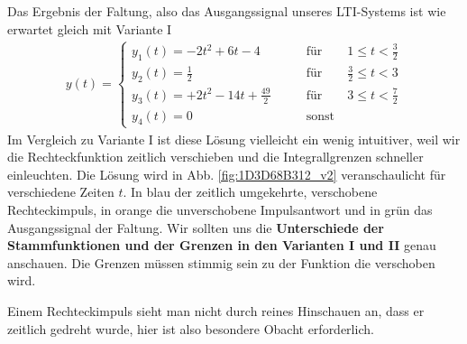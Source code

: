 \documentclass[11pt,a4paper,DIV=12]{scrartcl}
\numberwithin{equation}{section}
\numberwithin{figure}{section}
\newcommand{\fig}[1]{Abb. \ref{#1}} %
\begin{document}
\begin{Loesung}
Das Ergebnis der Faltung, also das Ausgangssignal unseres LTI-Systems ist
wie erwartet gleich mit Variante I
\begin{align}
y(t) =
\begin{cases}
  y_1(t) = -2 t^2 + 6 t - 4 &\qquad \mathrm{für} \qquad 1 \leq t < \frac{3}{2}\\
  y_2(t) = \frac{1}{2}  &\qquad \mathrm{für} \qquad \frac{3}{2} \leq t < 3\\
  y_3(t) = +2 t^2 - 14 t + \frac{49}{2} &\qquad \mathrm{für} \qquad 3 \leq t < \frac{7}{2}\\
  y_4(t)=0 &\qquad \mathrm{sonst}
\end{cases}
\end{align}
Im Vergleich zu Variante I ist diese Lösung vielleicht ein wenig
intuitiver, weil wir die Rechteckfunktion zeitlich verschieben und die
Integrallgrenzen schneller einleuchten.
%
Die Lösung wird in \fig{fig:1D3D68B312_v2} veranschaulicht für verschiedene
Zeiten $t$. In blau der zeitlich umgekehrte, verschobene Rechteckimpuls, in
orange die unverschobene Impulsantwort und in grün das Ausgangssignal der Faltung.
%
Wir sollten uns die \textbf{Unterschiede der Stammfunktionen und der Grenzen in den
Varianten I und II} genau anschauen.
Die Grenzen müssen stimmig sein zu der Funktion die verschoben wird.
%

Einem Rechteckimpuls sieht man nicht durch reines Hinschauen an, dass er
zeitlich gedreht wurde, hier ist also besondere Obacht erforderlich.
%
\end{Loesung}
\end{document}
